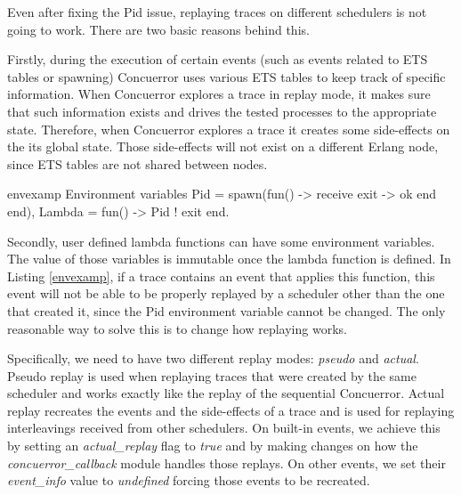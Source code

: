 Even after fixing the Pid issue, replaying traces on different schedulers is not going to work. There are two basic reasons behind this. 

Firstly, during the execution of certain events (such as events related to ETS tables or spawning) Concuerror uses various ETS 
tables to keep track of specific information. When Concuerror explores a trace in replay mode, it makes sure that such
 information exists and drives the tested processes to the appropriate state. Therefore, when Concuerror explores a
 trace it creates some side-effects on the its global state. Those side-effects will not exist on
 a different Erlang node, since ETS tables are not shared between nodes. 

\begin{code}{envexamp}{ Environment variables}
    Pid = spawn(fun() -> 
                    receive
                        exit ->
                            ok 
                    end
                end),
    Lambda =
        fun() ->
             Pid ! exit
        end.
\end{code}

Secondly, user defined lambda functions can have some environment variables. The value of those variables is
immutable once the lambda function is defined. In Listing \ref{envexamp}, if a trace contains an event
that applies this function, this event will not be able to be properly replayed by a scheduler other than the one that
created it, since the Pid environment variable cannot be changed. The only reasonable way to solve this is to
change how replaying works.

Specifically, we need to have two different replay modes: \textit{pseudo} and \textit{actual}. Pseudo replay is used when
replaying traces that were created by the same scheduler and works exactly like the replay of the sequential
Concuerror. Actual replay recreates the events and the side-effects of a trace and is used for
replaying interleavings received from other schedulers. On built-in events, we achieve this by setting an
\textit{actual\_replay} flag to \textit{true} and by making changes on how the \textit{concuerror\_callback} module handles those replays.
On other events, we set their \textit{event\_info} value to \textit{undefined} forcing those events to be recreated.
